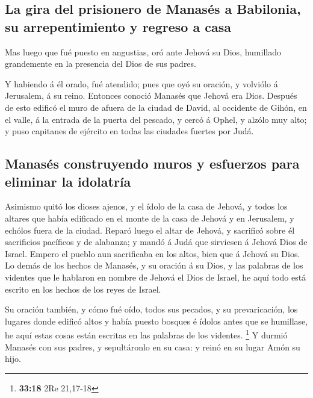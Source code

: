 \hypertarget{la-gira-del-prisionero-de-manasuxe9s-a-babilonia-su-arrepentimiento-y-regreso-a-casa}{%
\subsection{La gira del prisionero de Manasés a Babilonia, su
arrepentimiento y regreso a
casa}\label{la-gira-del-prisionero-de-manasuxe9s-a-babilonia-su-arrepentimiento-y-regreso-a-casa}}

 Mas luego que fué puesto en angustias, oró ante Jehová
su Dios, humillado grandemente en la presencia del Dios de sus padres.

 Y habiendo á él orado, fué atendido; pues que oyó su
oración, y volviólo á Jerusalem, á su reino. Entonces conoció Manasés
que Jehová era Dios.  Después de esto edificó el muro de
afuera de la ciudad de David, al occidente de Gihón, en el valle, á la
entrada de la puerta del pescado, y cercó á Ophel, y alzólo muy alto; y
puso capitanes de ejército en todas las ciudades fuertes por Judá.

\hypertarget{manasuxe9s-construyendo-muros-y-esfuerzos-para-eliminar-la-idolatruxeda}{%
\subsection{Manasés construyendo muros y esfuerzos para eliminar la
idolatría}\label{manasuxe9s-construyendo-muros-y-esfuerzos-para-eliminar-la-idolatruxeda}}

 Asimismo quitó los dioses ajenos, y el ídolo de la casa
de Jehová, y todos los altares que había edificado en el monte de la
casa de Jehová y en Jerusalem, y echólos fuera de la ciudad.
 Reparó luego el altar de Jehová, y sacrificó sobre él
sacrificios pacíficos y de alabanza; y mandó á Judá que sirviesen á
Jehová Dios de Israel.  Empero el pueblo aun sacrificaba
en los altos, bien que á Jehová su Dios.  Lo demás de los
hechos de Manasés, y su oración á su Dios, y las palabras de los
videntes que le hablaron en nombre de Jehová el Dios de Israel, he aquí
todo está escrito en los hechos de los reyes de Israel.

 Su oración también, y cómo fué oído, todos sus pecados,
y su prevaricación, los lugares donde edificó altos y había puesto
bosques é ídolos antes que se humillase, he aquí estas cosas están
escritas en las palabras de los videntes. \footnote{\textbf{33:18} 2Re
  21,17-18}  Y durmió Manasés con sus padres, y
sepultáronlo en su casa: y reinó en su lugar Amón su hijo.

